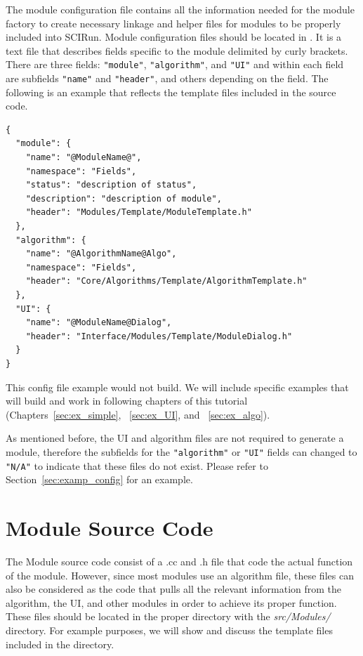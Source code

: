 \documentclass[fleqn,11pt,openany]{book}
\begin{document}
The module configuration file contains all the information needed for the module factory to create necessary linkage and helper files for modules to be properly included into SCIRun.  
Module configuration files should be located in \emph{}.  
It is a text file that describes fields specific to the module delimited by curly brackets.  
There are three fields: \verb|"module"|, \verb|"algorithm"|, and \verb|"UI"| and within each field are subfields \verb|"name"| and \verb|"header"|, and others depending on the field.  
The following is an example that reflects the template files included in the source code.
\begin{verbatim}
{
  "module": {
    "name": "@ModuleName@",
    "namespace": "Fields",
    "status": "description of status",
    "description": "description of module",
    "header": "Modules/Template/ModuleTemplate.h"
  },
  "algorithm": {
    "name": "@AlgorithmName@Algo",
    "namespace": "Fields",
    "header": "Core/Algorithms/Template/AlgorithmTemplate.h"
  },
  "UI": {
    "name": "@ModuleName@Dialog",
    "header": "Interface/Modules/Template/ModuleDialog.h"
  }
}
\end{verbatim}
This config file example would not build.  
We will include specific examples that will build and work in following chapters of this tutorial (Chapters~\ref{sec:ex_simple}, ~\ref{sec:ex_UI}, and ~\ref{sec:ex_algo}).

As mentioned before, the UI and algorithm files are not required to generate a module, therefore the subfields for the \verb|"algorithm"| or \verb|"UI"| fields can changed to \verb|"N/A"| to indicate that these files do not exist.  
Please refer to Section~\ref{sec:examp_config} for an example. 

\section{Module Source Code}
\label{sec:module}

The Module source code consist of a .cc and .h file that code the actual function of the module.
However, since most modules use an algorithm file, these files can also be considered as the code that pulls all the relevant information from the algorithm, the UI, and other modules in order to achieve its proper function.  
These files should be located in the proper directory with the \emph{src/Modules/} directory.
For example purposes, we will show and discuss the template files included in the \emph{} directory.
\end{document}
